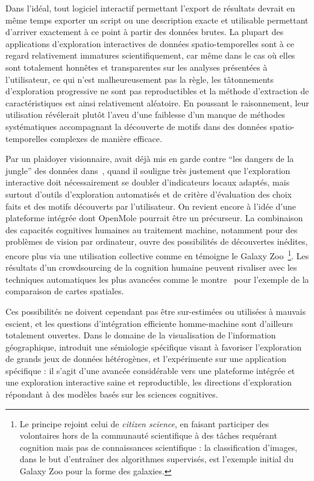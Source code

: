 Dans l'idéal, tout logiciel interactif permettant l'export de résultats devrait en même temps exporter un script ou une description exacte et utilisable permettant d'arriver exactement à ce point à partir des données brutes. La plupart des applications d'exploration interactives de données spatio-temporelles sont à ce regard relativement immatures scientifiquement, car même dans le cas où elles sont totalement honnêtes et transparentes sur les analyses présentées à l'utilisateur, ce qui n'est malheureusement pas la règle, les tâtonnements d'exploration progressive ne sont pas reproductibles et la méthode d'extraction de caractéristiques est ainsi relativement aléatoire. En poussant le raisonnement, leur utilisation révélerait plutôt l'aveu d'une faiblesse d'un manque de méthodes systématiques accompagnant la découverte de motifs dans des données spatio-temporelles complexes de manière efficace.

Par un plaidoyer visionnaire,  avait déjà mis en garde contre ``les dangers de la jungle'' des données dans~\cite{banos2001propos}, quand il souligne très justement que l'exploration interactive doit nécessairement se doubler d'indicateurs locaux adaptés, mais surtout d'outils d'exploration automatisés et de critère d'évaluation des choix faits et des motifs découverts par l'utilisateur. On revient encore à l'idée d'une plateforme intégrée dont OpenMole pourrait être un précurseur. La combinaison des capacités cognitives humaines au traitement machine, notamment pour des problèmes de vision par ordinateur, ouvre des possibilités de découvertes inédites, encore plus via une utilisation collective comme en témoigne le Galaxy Zoo~\cite{2010AEdRv...9a0103R}\footnote{Le principe rejoint celui de \emph{citizen science}, en faisant participer des volontaires hors de la communauté scientifique à des tâches requérant cognition mais pas de connaissances scientifique : la classification d'images, dans le but d'entraîner des algorithmes supervisés, est l'exemple initial du Galaxy Zoo pour la forme des galaxies.}. Les résultats d'un crowdsourcing de la cognition humaine peuvent rivaliser avec les techniques automatiques les plus avancées comme le montre~\cite{10.1371/journal.pone.0178165} pour l'exemple de la comparaison de cartes spatiales.


Ces possibilités ne doivent cependant pas être sur-estimées ou utilisées à mauvais escient, et les questions d'intégration efficiente homme-machine sont d'ailleurs totalement ouvertes. Dans le domaine de la visualisation de l'information géographique, \cite{pfaender2009spatialisation} introduit une sémiologie spécifique visant à favoriser l'exploration de grands jeux de données hétérogènes, et l'expérimente sur une application spécifique : il s'agit d'une avancée considérable vers une plateforme intégrée et une exploration interactive saine et reproductible, les directions d'exploration répondant à des modèles basés sur les sciences cognitives. 






